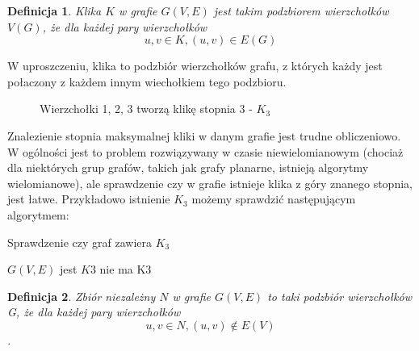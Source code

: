 \documentclass[11pt]{article}
\newtheorem{definition}{Definicja}[section]
\begin{document}
   \begin{definition}
    Klika $K$ w grafie $G(V,E)$ jest takim podzbiorem wierzchołków $V(G)$, że dla każdej pary wierzchołków $$u, v \in K, (u, v) \in E(G)$$ 
   \end{definition}
   
   W uproszczeniu, klika to podzbiór wierzchołków grafu, z których każdy jest połaczony z każdem innym wiechołkiem tego podzbioru.
   \begin{figure}[H]
   \centering
     \caption{Wierzchołki 1, 2, 3 tworzą klikę stopnia 3 - $K_3$ }
  \end{figure}

  Znalezienie stopnia maksymalnej kliki w danym grafie jest trudne obliczeniowo.
  W ogólności jest to problem rozwiązywany w czasie niewielomianowym (chociaż dla niektórych grup grafów, 
  takich jak grafy planarne, istnieją algorytmy wielomianowe), ale sprawdzenie czy w grafie istnieje klika
  z góry znanego stopnia, jest łatwe. Przykładowo istnienie $K_3$ możemy sprawdzić następującym algorytmem:
  
  \begin{algorithm}
    \caption{Sprawdzenie czy graf zawiera $K_3$}
    \begin{algorithmic}
    \REQUIRE $G(V, E) $
          \STATE \RETURN jest $K3$
        \ENDIF
      \ENDFOR
    \ENDFOR
    \STATE \RETURN nie ma K3
    \end{algorithmic}
  \end{algorithm}

  \begin{definition}
    Zbiór niezależny $N$ w grafie $G(V,E)$ to taki podzbiór wierzchołków G, że dla każdej pary wierzchołków $$u, v \in N, (u, v) \notin E(V) $$. 
  \end{definition}
\end{document}
